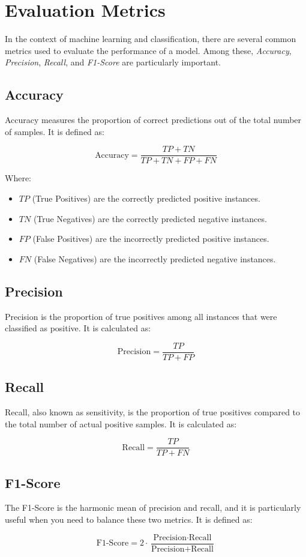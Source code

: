 \section{Evaluation Metrics}
In the context of machine learning and classification, there are several common metrics used to evaluate the performance of a model. Among these, \textit{Accuracy}, \textit{Precision}, \textit{Recall}, and \textit{F1-Score} are particularly important.

\subsection*{Accuracy}
Accuracy measures the proportion of correct predictions out of the total number of samples. It is defined as:

\begin{equation}
\text{Accuracy} = \frac{TP + TN}{TP + TN + FP + FN}
\end{equation}

Where:
\begin{itemize}
    \item $TP$ (True Positives) are the correctly predicted positive instances.
    \item $TN$ (True Negatives) are the correctly predicted negative instances.
    \item $FP$ (False Positives) are the incorrectly predicted positive instances.
    \item $FN$ (False Negatives) are the incorrectly predicted negative instances.
\end{itemize}

\subsection*{Precision}
Precision is the proportion of true positives among all instances that were classified as positive. It is calculated as:

\begin{equation}
\text{Precision} = \frac{TP}{TP + FP}
\end{equation}

\subsection*{Recall}
Recall, also known as sensitivity, is the proportion of true positives compared to the total number of actual positive samples. It is calculated as:

\begin{equation}
\text{Recall} = \frac{TP}{TP + FN}
\end{equation}

\subsection*{F1-Score}
The F1-Score is the harmonic mean of precision and recall, and it is particularly useful when you need to balance these two metrics. It is defined as:

\begin{equation}
\text{F1-Score} = 2 \cdot \frac{\text{Precision} \cdot \text{Recall}}{\text{Precision} + \text{Recall}}
\end{equation}
